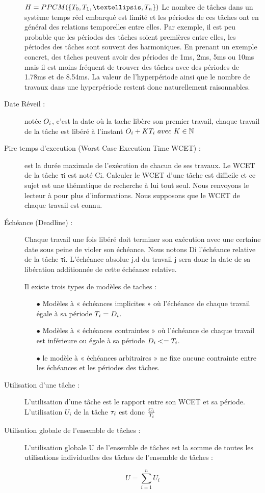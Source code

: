 \begin{description}
$H = PPCM(\{\periode{0},\periode{1},…,\periode{n}\})$
Le nombre de tâches dans un système temps réel embarqué est limité et les périodes de ces tâches ont en général des relations temporelles entre elles. Par exemple, il est peu probable que les périodes des tâches soient premières entre elles, les périodes des tâches sont souvent des harmoniques. En prenant un exemple concret, des tâches peuvent avoir des périodes de 1ms, 2ms, 5ms ou 10ms mais il est moins fréquent de trouver des tâches avec des périodes de 1.78ms et de 8.54ms. La valeur de l’hyperpériode ainsi que le nombre de travaux dans une hyperpériode restent donc naturellement raisonnables.
\item[Date Réveil :] notée $O_{i}$, c’est la date où la tache libère son premier travail, chaque travail de la tâche est libéré à l’instant $O_{i} + KT_{i}~avec~K \in \mathbb{N}$
\item[Pire temps d’execution (Worst Case Execution Time WCET) :] est la durée maximale de l’exécution de chacun de ses travaux. Le WCET de la tâche τi est noté Ci. Calculer le WCET d’une tâche est difficile et ce sujet est une thématique de recherche à lui tout seul. Nous renvoyons le lecteur à \cite{WEE+08} pour plus d’informations. Nous supposons que le WCET de chaque travail est connu.
\item[Échéance (Deadline) :] Chaque travail une fois libéré doit terminer son exécution avec une certaine date sous peine de violer son échéance. Nous notons Di l’échéance relative de la tâche τi. L’échéance absolue j.d du travail j sera donc la date de sa libération additionnée de cette échéance relative.

Il existe trois types de modèles  de taches : \\

\begin{itemize}
\item[$\bullet$] Modèles à « échéances implicites » où l’échéance de chaque travail égale à sa période $T_{i} = D_{i}$.
\item[$\bullet$] Modèles à « échéances contraintes » où l’échéance de chaque travail est inférieure ou égale à sa période $D_{i} <= T_{i}$.
\item[$\bullet$] le modèle à « échéances arbitraires » ne fixe aucune contrainte entre les échéances et les périodes des tâches.
\end{itemize}

\item[Utilisation d’une tâche :] L’utilisation d’une tâche est le rapport entre son WCET et sa période. L’utilisation $U_i$ de la tâche $\tau_{i}$ est donc $\frac{C_{i}}{T_{i}}$
\item[Utilisation globale de l’ensemble de tâches :] L’utilisation globale U de l’ensemble de tâches est la somme de toutes les utilisations individuelles des tâches de l’ensemble de tâches :

\begin{equation}
U = \sum_{i=1}^{n} U_i
\end{equation}

\end{description}
